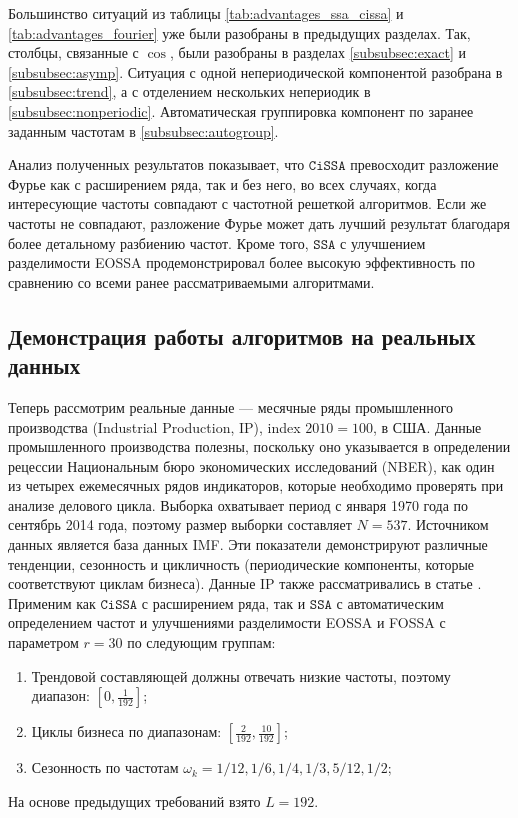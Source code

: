 \documentclass[12pt, specialist, subf
]{disser}
\theoremstyle{definition}
\newcommand{\SSA}{\texttt{SSA}}
\newcommand{\CISSA}{\texttt{CiSSA}}
\begin{document}
Большинство ситуаций из таблицы \ref{tab:advantages_ssa_cissa} и  \ref{tab:advantages_fourier} уже были разобраны в предыдущих разделах. Так, столбцы, связанные с $\cos$, были разобраны в разделах \ref{subsubsec:exact} и \ref{subsubsec:asymp}. Ситуация с одной непериодической компонентой разобрана в \ref{subsubsec:trend}, а с отделением нескольких непериодик в \ref{subsubsec:nonperiodic}. Автоматическая группировка компонент по заранее заданным частотам в \ref{subsubsec:autogroup}.

Анализ полученных результатов показывает, что $\CISSA$ превосходит разложение Фурье как с расширением ряда, так и без него, во всех случаях, когда интересующие частоты совпадают с частотной решеткой алгоритмов. Если же частоты не совпадают, разложение Фурье может дать лучший результат благодаря более детальному разбиению частот. Кроме того, $\SSA$ с улучшением разделимости EOSSA продемонстрировал более высокую эффективность по сравнению со всеми ранее рассматриваемыми алгоритмами.



\subsection{Демонстрация работы алгоритмов на реальных данных}
\label{subsubsec:real_dataZz}

Теперь рассмотрим реальные данные --- месячные ряды промышленного производства (Industrial Production, IP), index $2010 = 100$, в США. Данные промышленного производства полезны, поскольку оно указывается в определении рецессии Национальным бюро экономических исследований (NBER), как один из четырех ежемесячных рядов индикаторов, которые необходимо проверять при анализе делового цикла. Выборка охватывает период с января 1970 года по сентябрь 2014 года, поэтому размер выборки составляет $N = 537$. Источником данных является база данных IMF. Эти показатели демонстрируют различные тенденции, сезонность и цикличность (периодические компоненты, которые соответствуют циклам бизнеса). Данные IP также рассматривались в статье \cite{bogalo2020}.
Применим как $\CISSA$ с расширением ряда, так и $\SSA$ с автоматическим определением частот и улучшениями разделимости EOSSA и FOSSA с параметром $r = 30$ по следующим группам:
\begin{enumerate}
	\item Трендовой составляющей должны отвечать низкие частоты, поэтому диапазон: $\left[0, \frac{1}{192}\right]$;
	\item Циклы бизнеса по диапазонам: $\left[\frac{2}{192}, \frac{10}{192}\right]$;
	\item Сезонность по частотам $\omega_k = 1/12, 1/6, 1/4, 1/3, 5/12, 1/2$;
\end{enumerate}
На основе предыдущих требований взято $L = 192$.
\end{document}
